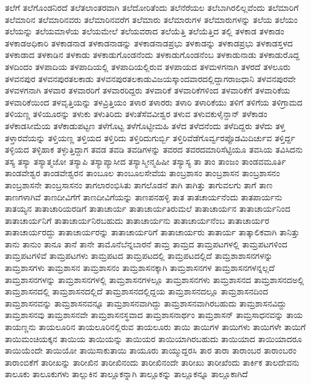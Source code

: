 {ತಲೆಗೆ
ತಲೆಗೊಂಡನಿರದೆ
ತಲೆತಲಾಂತರವಾಗಿ
ತಲೆದೋರಿತೆಂದು
ತಲೆನೆರೆಯಲ
ತಲೆಬಾಗಿರಲಿಲ್ಲವೆಂದು
ತಲೆಮಾರಿಗೆ
ತಲೆಮಾರಿನ
ತಲೆಮಾರಿನವರು
ತಲೆಮಾರಿನವರೆಗ
ತಲೆಮಾರು
ತಲೆಮಾರುಗಳ
ತಲೆಮಾರುಗಳನ್ನು
ತಲೆಯ
ತಲೆಯಂ
ತಲೆಯನ್ನು
ತಲೆಯಮಾಳೆಯ
ತಲೆಯಮೇಲೆ
ತಲೆಯವರಾದ
ತಲೆಯೆತ್ತಿ
ತಲೆಯೆತ್ತಿದ
ತಲ್ಲಿ
ತಳಕಾಡ
ತಳಕಾಡಂ
ತಳಕಾಡಅಧಿಕಾರಿ
ತಳಕಾಡನಾಡ
ತಳಕಾಡನಾಡನ್ನು
ತಳಕಾಡನಾಡಪ್ರಭು
ತಳಕಾಡನ್ನು
ತಳಕಾಡಪ್ರಭು
ತಳಕಾಡಸ್ತಳದ
ತಳಕಾಡಾದ
ತಳಕಾಡಿನ
ತಳಕಾಡು
ತಳಕಾಡುಗೊಂಡನೆಂದು
ತಳಕಾಡುಗೊಂಡನೆಂಬ
ತಳಕಾಡುನಾಡು
ತಳಕಾಡುರೊದ್ದ
ತಳದಿಂದಂ
ತಳಪಾದಿಯ
ತಳಪಾದಿಯಲ್ಲಿ
ತಳಪಾದಿಯಲ್ಲಿರುವ
ತಳಪಾಯದ
ತಳಮಳಗನಾಗಿ
ತಳರದೆ
ತಳಲೂರು
ತಳವನಪುರ
ತಳವನಪುರತಲಕಾಡು
ತಳವನಪುರತಲಕಾಡುವಿಜಯಸ್ಕಾಂದವಾರದಲ್ಲಿದ್ದಾಗರಾಜಧಾನಿ
ತಳವನಪುರವೇ
ತಳವಳಗನಾಗಿ
ತಳವಾರ
ತಳವಾರರಿಗೆ
ತಳವಾರರಿದ್ದರು
ತಳವಾರಿಕೆ
ತಳವಾರಿಕೆಗಳಿಂದ
ತಳವಾರಿಕೆಗೆ
ತಳವಾರಿಕೆಯ
ತಳವಾರಿಕೆಯಿಂದ
ತಳವೃತ್ತಿಯನ್ನು
ತಳವ್ರಿತ್ತಿಯಂ
ತಳಾರ
ತಳಾರರು
ತಳಾರಿ
ತಳಾರಿಕೆಯು
ತಳಿಗೆ
ತಳಿಗೆಯ
ತಳಿಗ್ರಾಮದ
ತಳಿಯಣ್ಣ
ತಳಿಯೂರನ್ನು
ತಳುಕು
ತಳುತಿರಿದು
ತಳುತೆಸೆವವೀಶ್ವರ
ತಳುವ
ತಳುವಕುಳೈನ್ದಾನ್
ತಳೆಕಾಡಂ
ತಳೆಕಾಡಸೀಮೆಯ
ತಳೆಕಾಡುಪಟ್ಟಣ
ತಳೆಗೊಟ್ಟ
ತಳೆಗೊಟ್ಟೀಮಹಿ
ತಳೆದ
ತಳೆದನೆಂದು
ತಳೆದಿದ್ದರು
ತಳೆದು
ತಳ್ತ
ತಳ್ತಾರವೆಯನ್ನು
ತಳ್ತಿಯಣ್ಣ
ತಳ್ತಿಯದ
ತಳ್ತಿರಿದು
ತಳ್ತಿರಿದುಗುರ್ಬ್ಬಿ
ತಳ್ತಿರಿವೆಡೆಗೊರ್ವ್ವರಪ್ಪೊಡಮಿದಿರ್ಚುವ
ತಳ್ತಿರ್ದ್ದ
ತಳ್ಳಿಯದ
ತಳ್ಳಿಹಾಕ
ತಳ್ಳುತ್ತಿದ್ದಾಗ
ತವಡ
ತವಡಿ
ತವಡಿಗಳನ್ನು
ತವರದ
ತವರದಮಾರಿಸೆಟ್ಟಿಯೂ
ತವಸಿಯ
ತವಿಸಿದನು
ತಸ್ಯ
ತಸ್ಯಾ
ತಸ್ಯಾತ್ಮಜೋ
ತಸ್ಯಾಪಿ
ತಸ್ಯಾಪ್ಯಾಸೀದ
ತಸ್ಯಾಸ್ಮೀನ್ಮಹಿಷೀ
ತಸ್ಯಾಸ್ಯ
ತಾ
ತಾಂ
ತಾಂಜಂ
ತಾಂಡವಮೂರ್ತಿ
ತಾಂಡವೇಶ್ವರ
ತಾಂಡವೇಶ್ವರನ
ತಾಂಬೂಲ
ತಾಂಬೂಲಸೇವೆಯ
ತಾಂಬ್ರಶಾಸಂ
ತಾಂಬ್ರಶಾಸನ
ತಾಂಬ್ರಶಾಸನಂ
ತಾಂಬ್ರಶಾಸನೇ
ತಾಂಬ್ರಸಾಸನಂ
ತಾಗಲಾರಂಭಿಸಿತು
ತಾಗಲೊಡನೆ
ತಾಗಿ
ತಾಗಿತ್ತು
ತಾಗುವಲಗು
ತಾಗೆ
ತಾಣ
ತಾಣಗಳಾಗಿವೆ
ತಾಣದೀವಿಗೆಗೆ
ತಾಣದೀವಿಗೆಯನ್ನು
ತಾಣಪನಹಳ್ಳಿ
ತಾತ
ತಾತಚಾರ್ಯನೆಂದು
ತಾತಪಾರ್ಯನು
ತಾತಯ್ಯನ
ತಾತಾಚಾರಿಯರಡಿಗೆ
ತಾತಾಚಾರ್ಯ
ತಾತಾಚಾರ್ಯತಿರುಮಲೆ
ತಾತಾಚಾರ್ಯನ
ತಾತಾಚಾರ್ಯನಿಂದ
ತಾತಾಚಾರ್ಯನಿಗೆ
ತಾತಾಚಾರ್ಯನಿರಬಹುದು
ತಾತಾಚಾರ್ಯನು
ತಾತಾಚಾರ್ಯನೆಂಬ
ತಾತಾಚಾರ್ಯರ
ತಾತಾಚಾರ್ಯರದ್ದು
ತಾತಾಚಾರ್ಯರನ್ನು
ತಾತಾಚಾರ್ಯರಿಗೆ
ತಾತಾಚಾರ್ಯರು
ತಾತಾರ್ಯ
ತಾತ್ಕಾಲಿಕವಾಗಿ
ತಾನಿತ್ತು
ತಾನು
ತಾನುಂ
ತಾನೂ
ತಾನೆ
ತಾನೇ
ತಾಮೊನೆಬೆನ್ನಬಾರನೆ
ತಾಮ್ರ
ತಾಮ್ರದ
ತಾಮ್ರಪಟಗಳಲ್ಲಿ
ತಾಮ್ರಪಟಗಳಿಂದ
ತಾಮ್ರಪಟಗಳಿವೆ
ತಾಮ್ರಪಟಗಳು
ತಾಮ್ರಪಟದ
ತಾಮ್ರಪಟದಲ್ಲಿ
ತಾಮ್ರಪಟದಲ್ಲಿದೆ
ತಾಮ್ರಶಾಶಾಸನಗಳನ್ನು
ತಾಮ್ರಶಾಸಗಳು
ತಾಮ್ರಶಾಸನ
ತಾಮ್ರಶಾಸನಂ
ತಾಮ್ರಶಾಸನಕ್ಕಾಗಿ
ತಾಮ್ರಶಾಸನಗಳ
ತಾಮ್ರಶಾಸನಗಳನ್ನಲ್ಲದೆ
ತಾಮ್ರಶಾಸನಗಳನ್ನು
ತಾಮ್ರಶಾಸನಗಳಲ್ಲಿ
ತಾಮ್ರಶಾಸನಗಳಲ್ಲೂ
ತಾಮ್ರಶಾಸನಗಳು
ತಾಮ್ರಶಾಸನದ
ತಾಮ್ರಶಾಸನದಅಲ್ಲಿ
ತಾಮ್ರಶಾಸನದಲ್ಲಿ
ತಾಮ್ರಶಾಸನದಲ್ಲಿದೆ
ತಾಮ್ರಶಾಸನದಲ್ಲಿದ್ದಯ
ತಾಮ್ರಶಾಸನದಲ್ಲೂ
ತಾಮ್ರಶಾಸನದಿಂದ
ತಾಮ್ರಶಾಸನವನ್ನು
ತಾಮ್ರಶಾಸನವನ್ನೂ
ತಾಮ್ರಶಾಸನವಾಗಿದ್ದು
ತಾಮ್ರಶಾಸನವಾಗಿರಬಹುದು
ತಾಮ್ರಶಾಸನವಿದ್ದು
ತಾಮ್ರಶಾಸನವು
ತಾಮ್ರಶಾಸನವೇ
ತಾಮ್ರಶಾಸನಸ್ಥವಾದ
ತಾಮ್ರಶಾಸನಾರ್ಥಂ
ತಾಮ್ರಶಾಸನ್
ತಾಮ್ರಸಾಧನವನ್ನು
ತಾಯ
ತಾಯಣ್ಣನು
ತಾಯಲೂರಿನ
ತಾಯಲೂರಿನಲ್ಲಿರುವ
ತಾಯಲೂರು
ತಾಯಿ
ತಾಯಿಗಳ
ತಾಯಿಗಳು
ತಾಯಿಗಳೇ
ತಾಯಿಗೆ
ತಾಯಿಮಂಚಿಯಕ್ಕನ
ತಾಯಿಯ
ತಾಯಿಯನ್ನು
ತಾಯಿಯರ
ತಾಯಿಯಾಗಿರಬಹುದು
ತಾಯಿಯಾದ
ತಾಯಿಯಾದರೂ
ತಾಯಿಯೆಂದೇ
ತಾಯಿಯೋ
ತಾಯಿಸಾಕುತಾಯಿ
ತಾಯೂರು
ತಾಯ್ಮುದ್ದರಸಿ
ತಾರ
ತಾರಾ
ತಾರಾಂಬರ
ತಾರಾಂಬರಂ
ತಾರಾಂಬಿಕೆಗೆ
ತಾರೀಖನ್ನು
ತಾರೀಖಿನ
ತಾರೀಖಿನಂದು
ತಾರೀಖಿನಂದೇ
ತಾರೀಖು
ತಾರೀಖೆಂದು
ತಾರ್ಕಿಕ
ತಾಲದೇವನು
ತಾಲೂಕು
ತಾಲೂಕುಗಳು
ತಾಲ್ಲುಕಿನ
ತಾಲ್ಲೂಕನ್ನಾಗಿ
ತಾಲ್ಲೂಕನ್ನು
ತಾಲ್ಲೂಕನ್ನೂ
ತಾಲ್ಲೂಕಾಗಿದೆ
}
